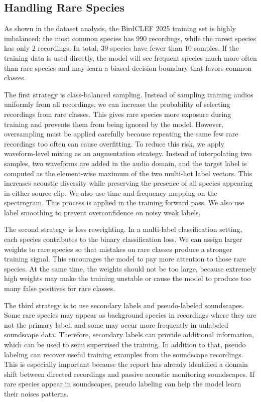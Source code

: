\documentclass[a4paper,12pt]{article}
\begin{document}
\subsection{Handling Rare Species}

As shown in the dataset analysis, the BirdCLEF 2025 training set is highly imbalanced: the most common species has $990$ recordings, while the rarest species has only $2$ recordings. In total, $39$ species have fewer than $10$ samples. If the training data is used directly, the model will see frequent species much more often than rare species and may learn a biased decision boundary that favors common classes.

The first strategy is class-balanced sampling. Instead of sampling training audios uniformly from all recordings, we can increase the probability of selecting recordings from rare classes. This gives rare species more exposure during training and prevents them from being ignored by the model. However, oversampling must be applied carefully because repeating the same few rare recordings too often can cause overfitting. To reduce this risk, we apply waveform-level mixing as an augmentation strategy. Instead of interpolating two samples, two waveforms are added in the audio domain, and the target label is computed as the element-wise maximum of the two multi-hot label vectors. This increases acoustic diversity while preserving the presence of all species appearing in either source clip. We also use time and frequency mapping on the spectrogram. This process is applied in the training forward pass. We also use label smoothing to prevent overconfidence on noisy weak labels.

The second strategy is loss reweighting. In a multi-label classification setting, each species contributes to the binary classification loss. We can assign larger weights to rare species so that mistakes on rare classes produce a stronger training signal. This encourages the model to pay more attention to those rare species. At the same time, the weights should not be too large, because extremely high weights may make the training unstable or cause the model to produce too many false positives for rare classes.

The third strategy is to use secondary labels and pseudo-labeled soundscapes. Some rare species may appear as background species in recordings where they are not the primary label, and some may occur more frequently in unlabeled soundscape data. Therefore, secondary labels can provide additional information, which can be used to semi supervised the training. In addition to that, pseudo labeling can recover useful training examples from the soundscape recordings. This is especially important because the report has already identified a domain shift between directed recordings and passive acoustic monitoring soundscapes. If rare species appear in soundscapes, pseudo labeling can help the model learn their noises patterns.
\end{document}
